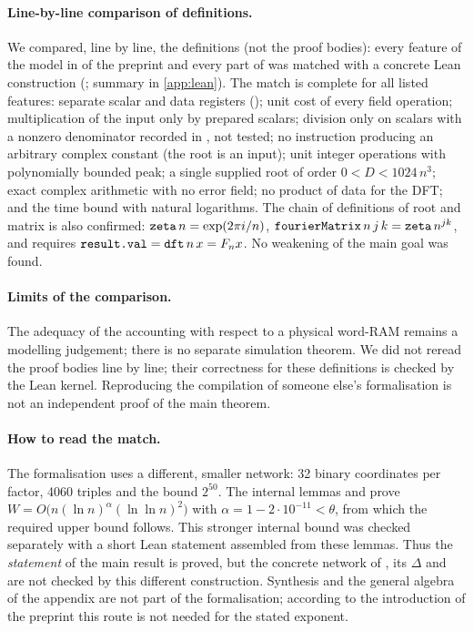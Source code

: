 \documentclass[11pt]{article}
\theoremstyle{plain}
\begin{document}
\paragraph{Line-by-line comparison of definitions.}
We compared, line by line, the definitions (not the proof bodies): every feature of the model in  of the preprint and every part of  was matched with a concrete Lean construction (; summary in \cref{app:lean}). The match is complete for all listed features: separate scalar and data registers (); unit cost of every field operation; multiplication of the input only by prepared scalars; division only on scalars with a nonzero denominator recorded in , not tested; no instruction producing an arbitrary complex constant (the root is an input); unit integer operations with polynomially bounded peak; a single supplied root of order $0<D<1024\,n^3$; exact complex arithmetic with no error field; no product of data for the DFT; and the time bound  with natural logarithms. The chain of definitions of root and matrix is also confirmed: $\texttt{zeta}\,n=\exp(2\pi i/n)$, $\texttt{fourierMatrix}\,n\,j\,k=\texttt{zeta}\,n^{jk}$, and  requires $\texttt{result.val}=\texttt{dft}\,n\,x=F_nx$. No weakening of the main goal was found.

\paragraph{Limits of the comparison.}
The adequacy of the  accounting with respect to a physical word-RAM remains a modelling judgement; there is no separate simulation theorem. We did not reread the proof bodies line by line; their correctness for these definitions is checked by the Lean kernel. Reproducing the compilation of someone else's formalisation is not an independent proof of the main theorem.

\paragraph{How to read the match.}
The formalisation uses a different, smaller network: 32 binary coordinates per factor, 4060 triples and the bound $2^{50}$. The internal lemmas  and  prove $W=O\bigl(n(\ln n)^{\alpha}(\ln\ln n)^2\bigr)$ with $\alpha=1-2\cdot10^{-11}<\theta$, from which the required upper bound  follows. This stronger internal bound was checked separately with a short Lean statement assembled from these lemmas. Thus the \emph{statement} of the main result is proved, but the concrete network of , its $\Delta$ and  are not checked by this different construction. Synthesis and the general algebra of the appendix are not part of the formalisation; according to the introduction of the preprint this route is not needed for the stated exponent.
\end{document}
